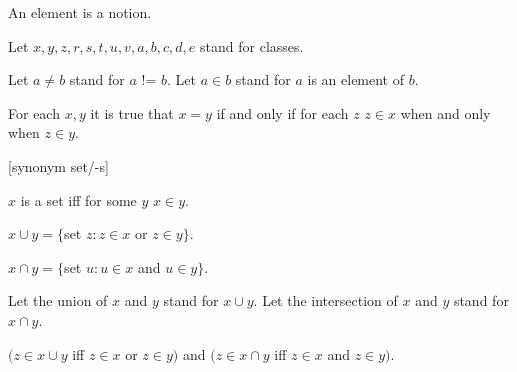 \documentclass[a4paper,draft]{amsproc}
\begin{document}
\begin{forthel}

\begin{signature}[ElmSort]
An element is a notion.
\end{signature}


Let $x, y, z, r, s, t, u, v, a, b, c, d, e$ stand for classes.

Let $a \neq b$ stand for $a$ != $b$.
Let $a \in b$ stand for $a$ is an element of $b$.

\begin{axiom} For each $x, y$  
it is true that $x = y$ if and only if for each $z$ $z \in x$ 
when and only when $z \in y$.
\end{axiom}


[synonym set/-s]

\begin{definition} 
$x$ is a set iff for some $y$ $x \in y$.
\end{definition}


\begin{definition} 
$x \cup y = \{$set $z : z \in x$ or $z \in y \}$.
\end{definition}

\begin{definition} 
$x \cap y = \{$set $u : u \in x$ and $u \in y \}$.
\end{definition}

Let the union of $x$ and $y$ stand for $x \cup y$.
Let the intersection of $x$ and $y$ stand for $x \cap y$.

\begin{theorem}
$(z \in x \cup y$ iff $z \in x$ or $z \in y)$
and $(z \in x \cap y$ iff $z \in x$ and $z \in y)$.
\end{theorem}


\end{forthel}
\end{document}
